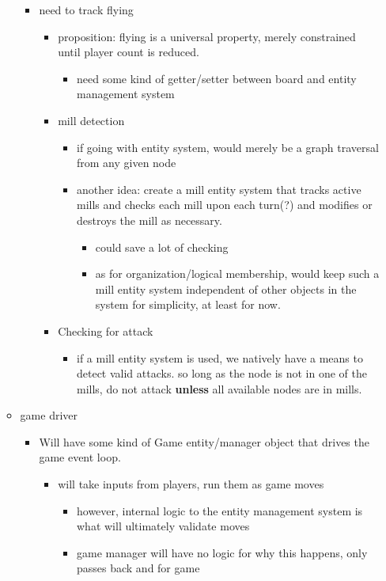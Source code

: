 \documentclass[11pt]{article}
\begin{document}
\begin{itemize}
\begin{itemize}
\begin{itemize}
\item need to track flying
\begin{itemize}
\item proposition: flying is a universal property, merely constrained until player count is
reduced.
\begin{itemize}
\item need some kind of getter/setter between board and entity management system
\end{itemize}
\item mill detection
\begin{itemize}
\item if going with entity system, would merely be a graph traversal from any given node
\item another idea: create a mill entity system that tracks active mills and checks each
mill upon each turn(?) and modifies or destroys the mill as necessary.
\begin{itemize}
\item could save a lot of checking
\item as for organization/logical membership, would keep such a mill entity system
independent of other objects in the system for simplicity, at least for now.
\end{itemize}
\end{itemize}
\item Checking for attack
\begin{itemize}
\item if a mill entity system is used, we natively have a means to detect valid attacks. so
long as the node is not in one of the mills, do not attack \textbf{unless} all available
nodes are in mills.
\end{itemize}
\end{itemize}
\end{itemize}
\item game driver
\begin{itemize}
\item Will have some kind of Game entity/manager object that drives the game event loop.
\begin{itemize}
\item will take inputs from players, run them as game moves
\begin{itemize}
\item however, internal logic to the entity management system is what will ultimately validate moves
\item game manager will have no logic for why this happens, only passes back and for game

\end{itemize}
\end{itemize}
\end{itemize}
\end{itemize}
\end{itemize}
\end{document}
